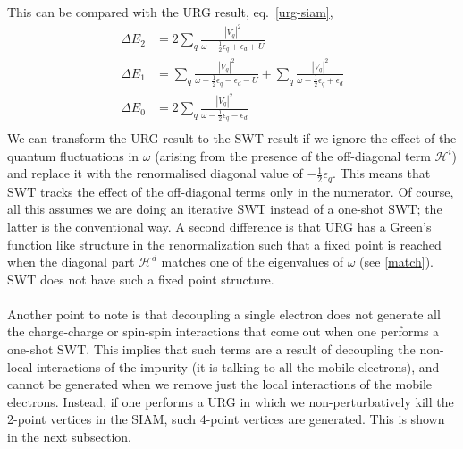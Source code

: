 \documentclass[twoside]{report}
\numberwithin{equation}{section}
\begin{document}
This can be compared with the URG result, eq.~\ref{urg-siam},
\begin{equation}\begin{aligned}
\Delta E_2 &= 2\sum_{q}\frac{|V_q|^2}{\omega - \frac{1}{2}\epsilon_q + \epsilon_d + U}\\
\Delta E_1 &= \sum_{q}\frac{|V_q|^2}{\omega - \frac{1}{2}\epsilon_q - \epsilon_d - U} + \sum_{q}\frac{|V_q|^2}{\omega - \frac{1}{2}\epsilon_q + \epsilon_d}\\
\Delta E_0 &= 2\sum_{q}\frac{|V_q|^2}{\omega - \frac{1}{2}\epsilon_q - \epsilon_d}\\
\end{aligned}\end{equation}
We can transform the URG result to the SWT result if we ignore the effect of the quantum fluctuations in \(\omega\) (arising from the presence of the off-diagonal term \(\mathcal{H}^i\)) and replace it with the renormalised diagonal value of \(-\frac{1}{2}\epsilon_q\). This means that SWT tracks the effect of the off-diagonal terms only in the numerator. Of course, all this assumes we are doing an iterative SWT instead of a one-shot SWT; the latter is the conventional way. A second difference is that URG has a Green's function like structure in the renormalization such that a fixed point is reached when the diagonal part \(\mathcal{H}^d\) matches one of the eigenvalues of \(\omega\) (see \ref{match}). SWT does not have such a fixed point structure.
\\\\Another point to note is that decoupling a single electron does not generate all the charge-charge or spin-spin interactions that come out when one performs a one-shot SWT. This implies that such terms are a result of decoupling the non-local interactions of the impurity (it is talking to all the mobile electrons), and cannot be generated when we remove just the local interactions of the mobile electrons. Instead, if one performs a URG in which we non-perturbatively kill the 2-point vertices in the SIAM, such 4-point vertices are generated. This is shown in the next subsection.
\end{document}
